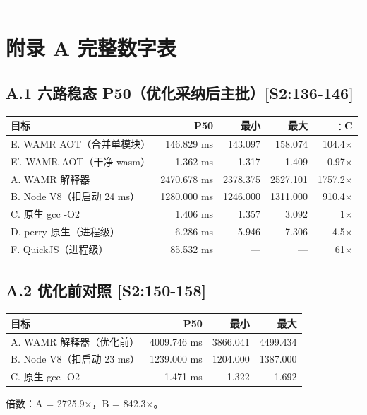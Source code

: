 \documentclass[11pt, a4paper]{article}
\begin{document}
\bigskip\hrule\bigskip

\section{附录 A 完整数字表}

\subsection{A.1 六路稳态 P50（优化采纳后主批）[S2:136-146]}

\begin{center}\small\begin{tabular}{lrrrr}
\toprule
目标 & P50 & 最小 & 最大 & ÷C \\
\midrule
E. WAMR AOT（合并单模块） & 146.829 ms & 143.097 & 158.074 & 104.4× \\
E′. WAMR AOT（干净 wasm） & 1.362 ms & 1.317 & 1.409 & 0.97× \\
A. WAMR 解释器 & 2470.678 ms & 2378.375 & 2527.101 & 1757.2× \\
B. Node V8（扣启动 24 ms） & 1280.000 ms & 1246.000 & 1311.000 & 910.4× \\
C. 原生 gcc -O2 & 1.406 ms & 1.357 & 3.092 & 1× \\
D. perry 原生（进程级） & 6.286 ms & 5.946 & 7.306 & 4.5× \\
F. QuickJS（进程级） & 85.532 ms & — & — & 61× \\
\bottomrule
\end{tabular}\end{center}


\subsection{A.2 优化前对照 [S2:150-158]}

\begin{center}\small\begin{tabular}{lrrr}
\toprule
目标 & P50 & 最小 & 最大 \\
\midrule
A. WAMR 解释器（优化前） & 4009.746 ms & 3866.041 & 4499.434 \\
B. Node V8（扣启动 23 ms） & 1239.000 ms & 1204.000 & 1387.000 \\
C. 原生 gcc -O2 & 1.471 ms & 1.322 & 1.692 \\
\bottomrule
\end{tabular}\end{center}


倍数：A = 2725.9×，B = 842.3×。
\end{document}
